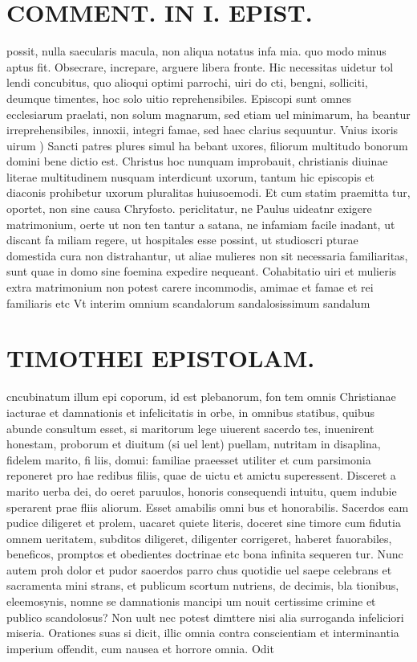 \documentclass{article}
\begin{document}
\begin{pages}
\section*{COMMENT. IN I. EPIST. }
\marginpar{[ p.66 ]}\pstart possit, nulla saecularis macula, non aliqua notatus infa mia. quo modo minus aptus fit. Obsecrare, increpare, arguere libera fronte. Hic necessitas uidetur tol lendi concubitus, quo alioqui optimi parrochi, uiri do cti, bengni, solliciti, deumque timentes, hoc solo uitio reprehensibiles. Episcopi sunt omnes ecclesiarum praelati, non solum magnarum, sed etiam uel minimarum, ha beantur irreprehensibiles, innoxii, integri famae, sed haec clarius sequuntur.  \pend\pstart Vnius ixoris uirum ) Sancti patres plures simul ha bebant uxores, filiorum multitudo bonorum domini bene dictio est. Christus hoc nunquam improbauit, christianis diuinae literae multitudinem nusquam interdicunt uxorum, tantum hic episcopis et diaconis prohibetur uxorum pluralitas huiusoemodi. Et cum statim praemitta tur, oportet, non sine causa Chryfosto. periclitatur, ne Paulus uideatnr exigere matrimonium, oerte ut non ten tantur a satana, ne infamiam facile inadant, ut discant fa miliam regere, ut hospitales esse possint, ut studioscri pturae domestida cura non distrahantur, ut aliae mulieres non sit necessaria familiaritas, sunt quae in domo sine foemina expedire nequeant. Cohabitatio uiri et mulieris extra matrimonium non potest carere incommodis, amimae et famae et rei familiaris etc Vt interim omnium scandalorum sandalosissimum sandalum  \pend
\section*{TIMOTHEI EPISTOLAM. }
\marginpar{[ p.67 ]}\pstart cncubinatum illum epi coporum, id est plebanorum, fon tem omnis Christianae iacturae et damnationis et infelicitatis in orbe, in omnibus statibus, quibus abunde consultum esset, si maritorum lege uiuerent sacerdo tes, inuenirent honestam, proborum et diuitum (si uel lent) puellam, nutritam in disaplina, fidelem marito, fi liis, domui: familiae praeesset utiliter et cum parsimonia reponeret pro hae redibus filiis, quae de uictu et amictu superessent. Disceret a marito uerba dei, do oeret paruulos, honoris consequendi intuitu, quem indubie sperarent prae fliis aliorum. Esset amabilis omni bus et honorabilis. Sacerdos eam pudice diligeret et prolem, uacaret quiete literis, doceret sine timore cum fidutia omnem ueritatem, subditos diligeret, diligenter corrigeret, haberet fauorabiles, beneficos, promptos et obedientes doctrinae etc bona infinita sequeren tur. Nunc autem proh dolor et pudor saoerdos parro chus quotidie uel saepe celebrans et sacramenta mini strans, et publicum scortum nutriens, de decimis, bla tionibus, eleemosynis, nomne se damnationis mancipi um nouit certissime crimine et publico scandolosus? Non uult nec potest dimttere nisi alia surroganda infeliciori miseria. Orationes suas si dicit, illic omnia contra conscientiam et interminantia imperium offendit, cum nausea et horrore omnia. Odit  \pend

\end{pages}
\end{document}
